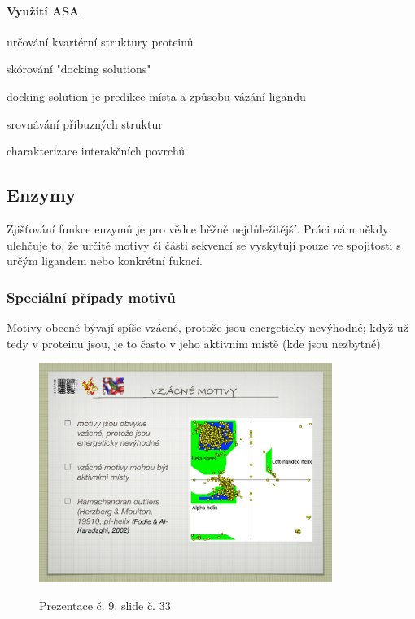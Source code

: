 \documentclass[DIV=8]{scrreprt}
\begin{document}
\paragraph{Využití ASA}
\begin{myItemize}[nosep]
    \item určování kvartérní struktury proteinů
    \item skórování "docking solutions"
\begin{myItemize}[nosep]
    \item docking solution je predikce místa a způsobu vázání ligandu
\end{myItemize}

    \item srovnávání příbuzných struktur
    \item charakterizace interakčních povrchů
\end{myItemize}



\subsection{Enzymy} \label{Enzymy}


Zjišťování funkce enzymů je pro vědce běžně nejdůležitější. Práci nám někdy ulehčuje to, že určité motivy či části sekvencí se vyskytují pouze ve spojitosti s určým ligandem nebo konkrétní fukncí.

\subsubsection{Speciální případy motivů} \label{Speciální případy motivů}


Motivy obecně bývají spíše vzácné, protože jsou energeticky nevýhodné; když už tedy v proteinu jsou, je to často v jeho aktivním místě (kde jsou nezbytné). \begin{figure}
    \caption{Prezentace č. 9, slide č. 33}
    \includegraphics[width=0.85\textwidth]{slides-9/slide-33.jpg}
    \centering
    \label{slides-9-slide-33}
\end{figure}
\end{document}
